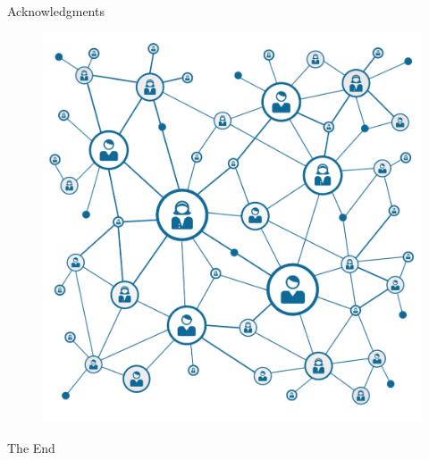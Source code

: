 \documentclass[8pt,aspectratio=1610]{beamer}
\begin{document}
\begin{frame}{Acknowledgments}
	\begin{figure}
		\includegraphics[width=0.35\linewidth]{network.png}
	\end{figure}
	\let\thefootnote\relax{}
\end{frame}


\begin{frame}{}
	\begin{center}
		\Large{The End}
	\end{center}
\end{frame}

\appendix

\end{document}
